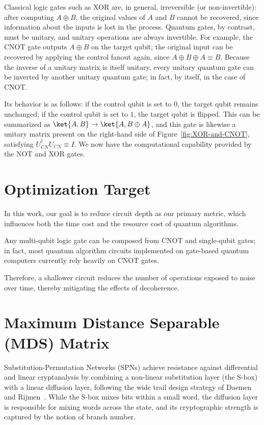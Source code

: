 Classical logic gates such as XOR are, in general, irreversible (or
non-invertible): after computing $A \oplus B$, the original values of $A$
and $B$ cannot be recovered, since information about the inputs is lost in
the process. Quantum gates, by contrast, must be unitary, and unitary
operations are always invertible. For example, the CNOT gate outputs
$A \oplus B$ on the target qubit; the original input can be recovered by
applying the control fanout again, since $A \oplus B \oplus A \equiv B$.
Because the inverse of a unitary matrix is itself unitary, every unitary
quantum gate can be inverted by another unitary quantum gate; in fact,
by itself, in the case of CNOT.

Its behavior is as follows: if the control qubit is set to $0$, the target qubit remains unchanged; if the control qubit is set to $1$, the target qubit is flipped. This can be summarized as $\ket{A, B} \rightarrow \ket{A, B \oplus A}$, and this gate is likewise a unitary matrix present on the right-hand side of Figure~\ref{fig:XOR-and-CNOT}, satisfying $U_{CN}^{\dagger}U_{CN} \equiv I$. We now have the computational capability provided by the NOT and XOR gates.

\section{Optimization Target}

In this work, our goal is to reduce circuit depth as our primary metric, which influences both the time cost and the resource cost of quantum algorithms.

Any multi-qubit logic gate can be composed from CNOT and single-qubit gates; in fact, most quantum algorithm circuits implemented on gate-based quantum computers currently rely heavily on CNOT gates.

Therefore, a shallower circuit reduces the number of operations exposed to noise over time, thereby mitigating the effects of decoherence.

\section{Maximum Distance Separable (MDS) Matrix}
\label{sec:mds}

Substitution-Permutation Networks (SPNs) achieve resistance against differential
and linear cryptanalysis by combining a non-linear substitution layer (the S-box)
with a linear diffusion layer, following the wide trail design strategy of Daemen
and Rijmen~\cite{daemen2001wide}. While the S-box mixes bits within a small word, the
diffusion layer is responsible for mixing words across the state, and its
cryptographic strength is captured by the notion of branch number.

